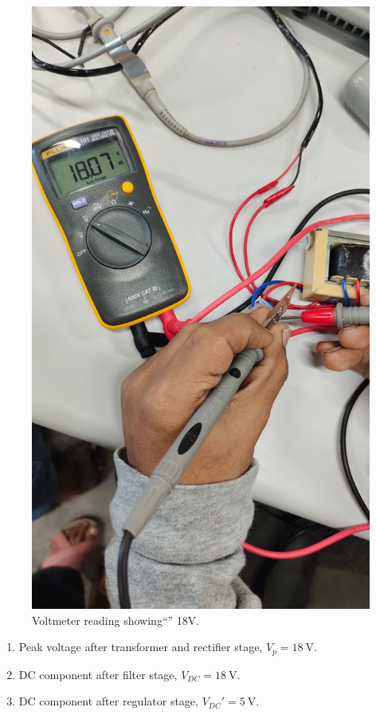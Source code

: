 \documentclass[journal,12pt,twocolumn]{IEEEtran}
\begin{document}
\begin{figure}[!ht]
    \includegraphics[width=\columnwidth]{figs/18V.jpeg}
    \caption{Voltmeter reading showing``'' 18V.}
    \label{fig:regulator_dc}
\end{figure}
\begin{enumerate}
    \item Peak voltage after transformer and rectifier stage, 
        $V_p = \SI[parse-numbers=false]{18}{\V}$.
    \item DC component after filter stage, 
        $V_{DC} = \SI[parse-numbers=false]{18}{\V}$.
    \item DC component after regulator stage, $V_{DC}' = \SI{5}{\V}$.
\end{enumerate}
\end{document}
